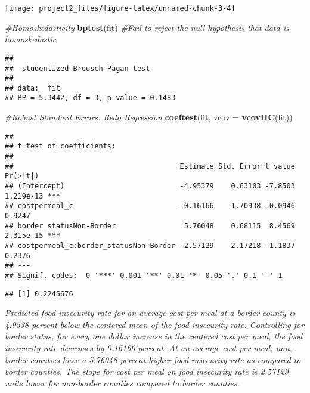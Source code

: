 \documentclass[]{article}
\newenvironment{Shaded}{\begin{snugshade}}{\end{snugshade}}
\newcommand{\CommentTok}[1]{\textcolor[rgb]{0.56,0.35,0.01}{\textit{#1}}}
\newcommand{\DataTypeTok}[1]{\textcolor[rgb]{0.13,0.29,0.53}{#1}}
\newcommand{\KeywordTok}[1]{\textcolor[rgb]{0.13,0.29,0.53}{\textbf{#1}}}
\newcommand{\NormalTok}[1]{#1}
\newcommand{\OperatorTok}[1]{\textcolor[rgb]{0.81,0.36,0.00}{\textbf{#1}}}
\begin{document}
\begin{center}\texttt{[image: project2\_files/figure-latex/unnamed-chunk-3-4]} \end{center}

\begin{Shaded}
\begin{Highlighting}[]
\CommentTok{#Homoskedasticity}
\KeywordTok{bptest}\NormalTok{(fit) }\CommentTok{#Fail to reject the null hypothesis that data is homoskedastic}
\end{Highlighting}
\end{Shaded}

\begin{verbatim}
## 
##  studentized Breusch-Pagan test
## 
## data:  fit
## BP = 5.3442, df = 3, p-value = 0.1483
\end{verbatim}

\begin{Shaded}
\begin{Highlighting}[]
\CommentTok{#Robust Standard Errors: Redo Regression}
\KeywordTok{coeftest}\NormalTok{(fit, }\DataTypeTok{vcov =} \KeywordTok{vcovHC}\NormalTok{(fit))}
\end{Highlighting}
\end{Shaded}

\begin{verbatim}
## 
## t test of coefficients:
## 
##                                       Estimate Std. Error t value  Pr(>|t|)    
## (Intercept)                           -4.95379    0.63103 -7.8503 1.219e-13 ***
## costpermeal_c                         -0.16166    1.70938 -0.0946    0.9247    
## border_statusNon-Border                5.76048    0.68115  8.4569 2.315e-15 ***
## costpermeal_c:border_statusNon-Border -2.57129    2.17218 -1.1837    0.2376    
## ---
## Signif. codes:  0 '***' 0.001 '**' 0.01 '*' 0.05 '.' 0.1 ' ' 1
\end{verbatim}

\begin{Shaded}
\end{Shaded}

\begin{verbatim}
## [1] 0.2245676
\end{verbatim}

\emph{Predicted food insecurity rate for an average cost per meal at a
border county is 4.9538 percent below the centered mean of the food
insecurity rate. Controlling for border status, for every one dollar
increase in the centered cost per meal, the food insecurity rate
decreases by 0.16166 percent. At an average cost per meal, non-border
counties have a 5.76048 percent higher food insecurity rate as compared
to border counties. The slope for cost per meal on food insecurity rate
is 2.57129 units lower for non-border counties compared to border
counties.}
\end{document}
